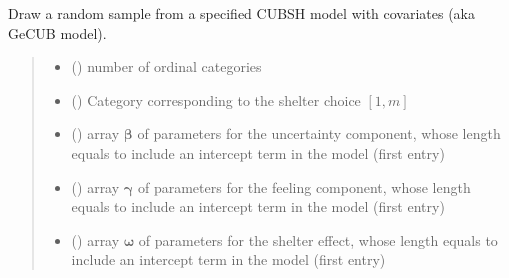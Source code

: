 \documentclass[letterpaper,10pt,english]{sphinxmanual}
\begin{document}
\begin{fulllineitems}
\label{\detokenize{cubmods:cubmods.cubsh_ywx.draw}}
\pysigstartsignatures
{}
\pysigstopsignatures
\sphinxAtStartPar
Draw a random sample from a specified CUBSH model with covariates
(aka GeCUB model).
\begin{quote}\begin{description}
\begin{itemize}
\item {} 
\sphinxAtStartPar
{} () \textendash{} number of ordinal categories

\item {} 
\sphinxAtStartPar
{} () \textendash{} Category corresponding to the shelter choice \([1,m]\)

\item {} 
\sphinxAtStartPar
{} () \textendash{} array \(\pmb \beta\) of parameters for the uncertainty component, whose length equals 
 to include an intercept term in the model (first entry)

\item {} 
\sphinxAtStartPar
{} () \textendash{} array \(\pmb \gamma\) of parameters for the feeling component, whose length equals 
 to include an intercept term in the model (first entry)

\item {} 
\sphinxAtStartPar
{} () \textendash{} array \(\pmb \omega\) of parameters for the shelter effect, whose length equals 
 to include an intercept term in the model (first entry)


\end{itemize}
\end{description}
\end{quote}
\end{fulllineitems}
\end{document}
